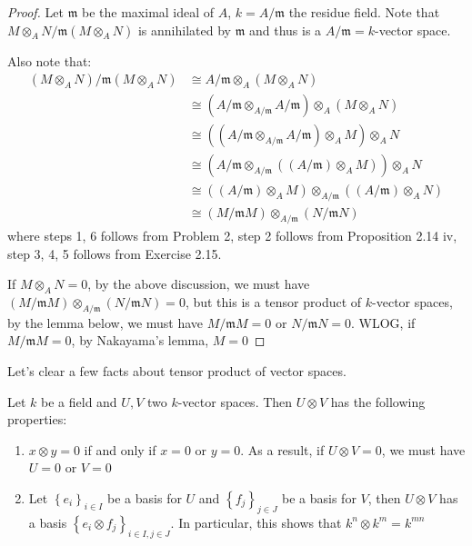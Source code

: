 \documentclass{solution}
\begin{document}
\begin{proof}
    Let $\mathfrak{m}$ be the maximal ideal of $A$, $k = A / \mathfrak{m}$ the residue field. Note that $M \otimes_A N / \mathfrak{m} (M \otimes_A N)$ is annihilated by $\mathfrak{m}$ and thus is a $A / \mathfrak{m} = k$-vector space.

    Also note that:
    $$
        \begin{aligned}
        (M \otimes_A N) / \mathfrak{m} (M \otimes_A N) &\cong A / \mathfrak{m} \otimes_A (M \otimes_A N) \\
        &\cong (A / \mathfrak{m} \otimes_{A / \mathfrak{m}} A / \mathfrak{m}) \otimes_A (M \otimes_A N) \\
        &\cong ((A / \mathfrak{m} \otimes_{A / \mathfrak{m}} A / \mathfrak{m}) \otimes_A M) \otimes_A N \\
        &\cong (A / \mathfrak{m} \otimes_{A / \mathfrak{m}} ((A / \mathfrak{m}) \otimes_A M)) \otimes_A N \\
        &\cong ((A / \mathfrak{m}) \otimes_A M) \otimes_{A / \mathfrak{m}} ((A / \mathfrak{m}) \otimes_A N) \\
        &\cong (M / \mathfrak{m}M) \otimes_{A / \mathfrak{m}} (N / \mathfrak{m}N)
        \end{aligned}
    $$
    where steps 1, 6 follows from Problem 2, step 2 follows from Proposition 2.14 iv, step 3, 4, 5 follows from Exercise 2.15.

    If $M \otimes_A N = 0$, by the above discussion, we must have $(M / \mathfrak{m}M) \otimes_{A / \mathfrak{m}} (N / \mathfrak{m}N) = 0$, but this is a tensor product of $k$-vector spaces, by the lemma below, we must have $M / \mathfrak{m} M = 0$ or $N / \mathfrak{m}N = 0$. WLOG, if $M / \mathfrak{m}M = 0$, by Nakayama's lemma, $M = 0$
\end{proof}

Let's clear a few facts about tensor product of vector spaces.

\begin{lemma}
    Let $k$ be a field and $U, V$ two $k$-vector spaces. Then $U \otimes V$ has the following properties:
    \begin{enumerate}
        \item $x \otimes y = 0$ if and only if $x = 0$ or $y = 0$. As a result, if $U \otimes V = 0$, we must have $U = 0$ or $V = 0$
        \item Let $\left\lbrace e_{i} \right\rbrace_{i \in I}$ be a basis for $U$ and $\left\lbrace f_j \right\rbrace_{j \in J}$ be a basis for $V$, then $U \otimes V$ has a basis $\left\lbrace e_i \otimes f_j \right\rbrace_{i \in I, j \in J}$. In particular, this shows that $k^n \otimes k^m = k^{mn}$
    \end{enumerate}
\end{lemma}
\end{document}
